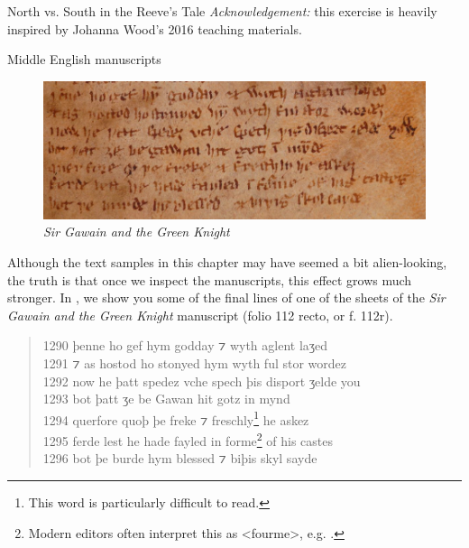 \begin{exercises}{North vs. South in the Reeve's Tale}
\noindent\emph{Acknowledgement:} this exercise is heavily inspired by Johanna Wood's 2016 teaching materials.

\end{exercises}

\begin{exercises}{Middle English manuscripts}

\begin{figure}[H]
    \includegraphics[width=\textwidth]{chapters/img/Gawain.png}
    \caption{\textit{Sir Gawain and the Green Knight}}
    \label{fig:Gawain}
\end{figure}

Although the text samples in this chapter may have seemed a bit alien-looking, the truth is that once we inspect the manuscripts, this effect grows much stronger. In , we show you some of the final lines of one of the sheets of the \textit{Sir Gawain and the Green Knight} manuscript (folio 112 recto, or f. 112r).


\begin{quote}
    1290 þenne ho gef hym godday ⁊ wyth aglent laʒed\\
    1291 ⁊ as hostod ho stonyed hym wyth ful stor wordez\\
    1292 now he þatt spedez vche spech þis disport ʒelde you\\
    1293 bot þatt ʒe be Gawan hit gotz in mynd\\
    1294 querfore quoþ þe freke ⁊ freschly\footnote{This word is particularly difficult to read.} he askez\\
    1295 ferde lest he hade fayled in forme\footnote{Modern editors often interpret this as <fourme>, e.g. \citet{TolkienGordon1967}.} of his castes\\
    1296 bot þe burde hym blessed ⁊ biþis skyl sayde
\end{quote}


\end{exercises}
